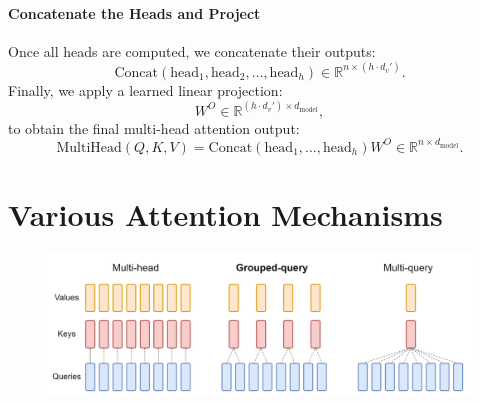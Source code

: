 \paragraph{Concatenate the Heads and Project}

   Once all heads are computed, we concatenate their outputs:
   \[
   \text{Concat}(\text{head}_1, \text{head}_2, \dots, \text{head}_h) \in \mathbb{R}^{n \times (h \cdot d_v')}.
   \]
   Finally, we apply a learned linear projection:
   \[
   W^O \in \mathbb{R}^{(h \cdot d_v') \times d_{\text{model}}},
   \]
   to obtain the final multi-head attention output:
   \[
   \text{MultiHead}(Q, K, V) = \text{Concat}(\text{head}_1, \dots, \text{head}_h) W^O \in \mathbb{R}^{n \times d_{\text{model}}}.
   \]


\section{Various Attention Mechanisms}

\begin{figure}[t]
	\centering
	\includegraphics[scale=0.5]{./images/transformer/multi_head_attention.png}
\end{figure}

